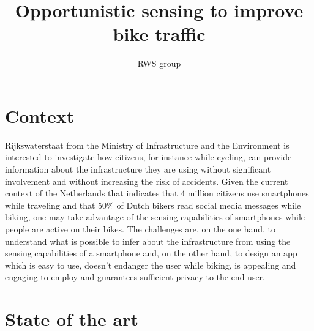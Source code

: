 \documentclass[preprint,12pt]{elsarticle}
\theoremstyle{definition}
\begin{document}
\begin{frontmatter}

\title{Opportunistic sensing to improve bike traffic}

\author{RWS group}













\end{frontmatter}


\section{Context}
Rijkswaterstaat from the Ministry of Infrastructure and the
Environment is interested to investigate how citizens, for instance
while cycling, can provide information about the infrastructure they
are using without significant involvement and without increasing the
risk of accidents. Given the current context of the Netherlands that
indicates that 4 million citizens use smartphones while traveling and
that 50\% of Dutch bikers read social media messages while biking, one
may take advantage of the sensing capabilities of smartphones while
people are active on their bikes. The challenges are, on the one hand, to understand
what is possible to infer about the infrastructure from using the
sensing capabilities of a smartphone and, on the other hand, to design
an app which is easy to use, doesn't endanger the user while biking,
is appealing and engaging to employ and guarantees sufficient privacy
to the end-user. 


\section{State of the art}
\end{document}
